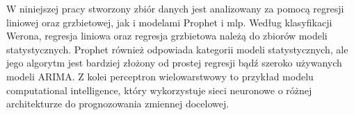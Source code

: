 W niniejszej pracy stworzony zbiór danych jest analizowany za pomocą regresji liniowej oraz grzbietowej, jak i modelami Prophet i \gls{mlp}. Według klasyfikacji Werona, regresja liniowa oraz regresja grzbietowa należą do zbiorów modeli statystycznych. Prophet również odpowiada kategorii modeli statystycznych, ale jego algorytm jest bardziej złożony od prostej regresji bądź szeroko używanych modeli ARIMA. Z kolei perceptron wielowarstwowy to przykład modelu computational intelligence, który wykorzystuje sieci neuronowe o różnej architekturze do prognozowania zmiennej docelowej.
